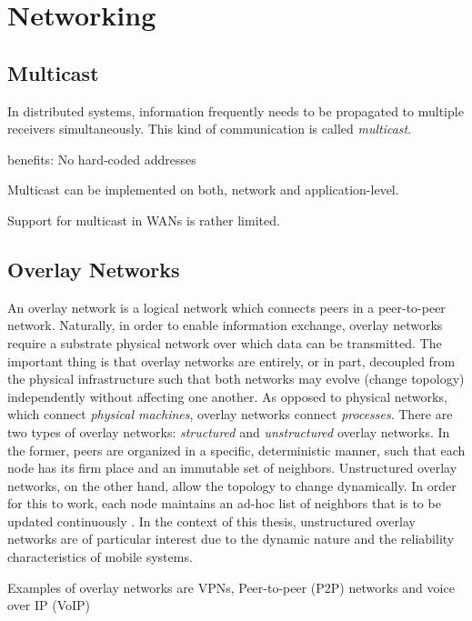 \section{Networking}

\subsection{Multicast}

In distributed systems, information frequently needs to be propagated to multiple receivers simultaneously. This kind of communication is called \emph{multicast}.

benefits: No hard-coded addresses

Multicast can be implemented on both, network and application-level.

Support for multicast in WANs is rather limited.



\subsection{Overlay Networks}

An overlay network is a logical network which connects peers in a peer-to-peer network. Naturally, in order to enable information exchange, overlay networks require a substrate physical network over which data can be transmitted. The important thing is that overlay networks are entirely, or in part, decoupled from the physical infrastructure such that both networks may evolve (change topology) independently without affecting one another. As opposed to physical networks, which connect \emph{physical machines}, overlay networks connect \emph{processes}. There are two types of overlay networks: \emph{structured} and \emph{unstructured} overlay networks. In the former, peers are organized in a specific, deterministic manner, such that each node has its firm place and an immutable set of neighbors. Unstructured overlay networks, on the other hand, allow the topology to change dynamically. In order for this to work, each node maintains an ad-hoc list of neighbors that is to be updated continuously \cite{tanenbaum2017distributed}. In the context of this thesis, unstructured overlay networks are of particular interest due to the dynamic nature and the reliability characteristics of mobile systems.


Examples of overlay networks are VPNs, Peer-to-peer (P2P) networks and voice over IP (VoIP)


